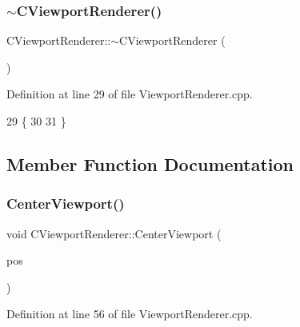 \subsubsection{\texorpdfstring{$\sim$\+C\+Viewport\+Renderer()}{~CViewportRenderer()}}
{\footnotesize\ttfamily C\+Viewport\+Renderer\+::$\sim$\+C\+Viewport\+Renderer (\begin{DoxyParamCaption}{ }\end{DoxyParamCaption})}



Definition at line 29 of file Viewport\+Renderer.\+cpp.


\begin{DoxyCode}
29                                      \{
30 
31 \}
\end{DoxyCode}


\subsection{Member Function Documentation}
\hypertarget{classCViewportRenderer_a12842df851be0f115a735cec994d863e}{}\label{classCViewportRenderer_a12842df851be0f115a735cec994d863e} 
\subsubsection{\texorpdfstring{Center\+Viewport()}{CenterViewport()}}
{\footnotesize\ttfamily void C\+Viewport\+Renderer\+::\+Center\+Viewport (\begin{DoxyParamCaption}\item[{const \hyperlink{classCPosition}{C\+Position} \&}]{pos }\end{DoxyParamCaption})}



Definition at line 56 of file Viewport\+Renderer.\+cpp.



